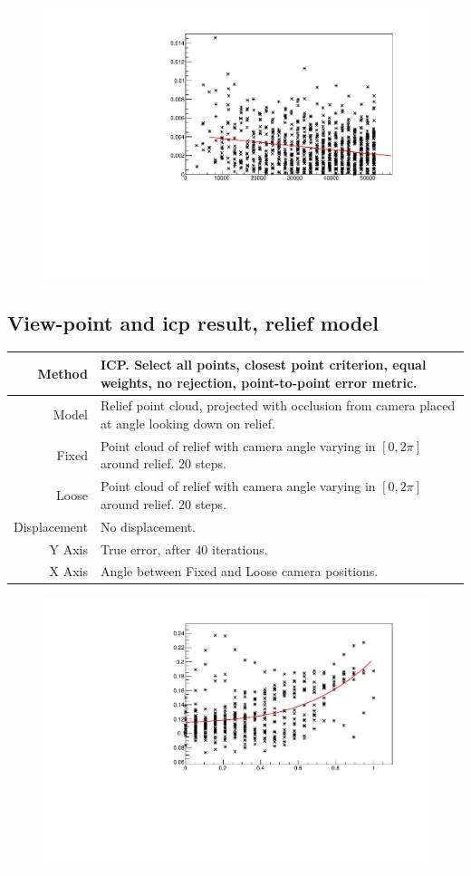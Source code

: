 {\begin{figure}[H]
\centering
\includegraphics[width=.7\textwidth]{fig/sphere_icp.pdf}
\end{figure}


\subsection{View-point and \gls{icp} result, relief model} \label{sec:ex_relief_dproj}

\begin{tabularx}{\textwidth}{|r|X|} \hline
Method & ICP. Select all points, closest point criterion, equal weights, no rejection, point-to-point error metric. \\ \hline
Model & Relief point cloud, projected with occlusion from camera placed at angle looking down on relief. \\ \hline
Fixed & Point cloud of relief with camera angle varying in $[0, 2 \pi]$ around relief. $20$ steps. \\ \hline
Loose & Point cloud of relief with camera angle varying in $[0, 2 \pi]$ around relief. $20$ steps. \\ \hline
Displacement & No displacement. \\ \hline
Y Axis & True error, after $40$ iterations. \\\hline
X Axis & Angle between Fixed and Loose camera positions. \\ \hline
\end{tabularx}

\begin{figure}[H]
\centering
\includegraphics[width=.7\textwidth]{fig/relief_dproj.pdf}
\end{figure}


}
